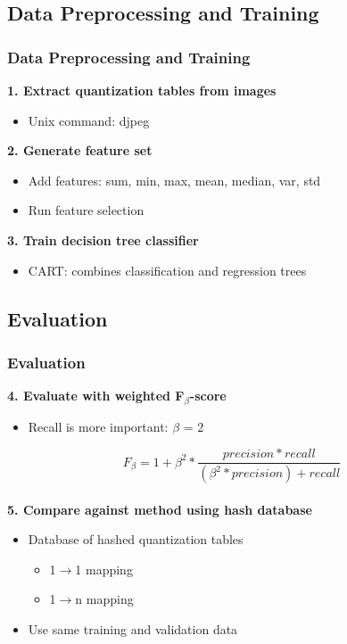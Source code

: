 \documentclass[10pt]{beamer}
\begin{document}
\subsection{Data Preprocessing and Training}
\begin{frame}
\frametitle{Data Preprocessing and Training}
\textbf{1. Extract quantization tables from images}
\begin{itemize}
\item Unix command: djpeg
\end{itemize}
\textbf{2. Generate feature set}
\begin{itemize}
\item Add features: sum, min, max, mean, median, var, std
\item Run feature selection
\end{itemize}
\textbf{3. Train decision tree classifier}
\begin{itemize}
\item CART: combines classification and regression trees
\end{itemize}
\end{frame}


\subsection{Evaluation}
\begin{frame}
\frametitle{Evaluation}
\textbf{4. Evaluate with weighted F$_\beta$-score}
\begin{itemize}
\item Recall is more important: $\beta$ = 2
\end{itemize}
\begin{equation}
F_\beta = 1 + \beta^{2} * \frac{precision * recall}{(\beta^{2} *precision) + recall}
\end{equation}
~\\
\textbf{5. Compare against method using hash database}
\begin{itemize}
\item Database of hashed quantization tables
\begin{itemize}
\item 1$\rightarrow$1 mapping
\item 1$\rightarrow$n mapping
\end{itemize}
\item Use same training and validation data
\end{itemize}
\end{frame}
\end{document}
